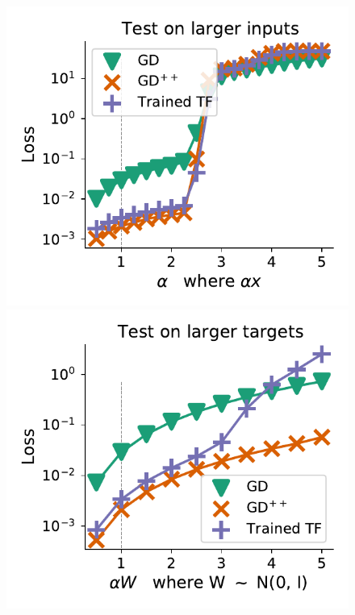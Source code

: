 \documentclass{article}
\theoremstyle{plain}
\theoremstyle{definition}
\theoremstyle{remark}
\begin{document}
\begin{figure}
\begin{center}
\begin{minipage}{.24\textwidth}
\begin{center}
  \end{center}
  \vspace{-10pt}
\end{minipage}
\begin{minipage}{.24\textwidth}
  \centering
  \begin{center}
    \includegraphics[width=1.\textwidth]{Final_figures/linear/linear_five_layer/normal_12.pdf}
  \end{center}
  \vspace{-10pt}
\end{minipage}
\begin{minipage}{.24\textwidth}
  \centering
  \begin{center}
    \includegraphics[width=1.\textwidth]{Final_figures/linear/linear_five_layer/ood_9.pdf}

\end{center}
\end{minipage}
\end{center}
\end{figure}
\end{document}
